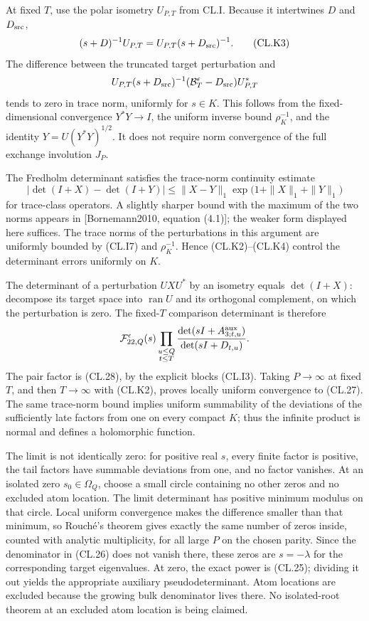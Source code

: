 At fixed \(T\), use the polar isometry \(U_{P,T}\) from CL.I. Because it intertwines \(D\) and \(D_{\rm src}\), \[
(s+D)^{-1}U_{P,T}
=U_{P,T}(s+D_{\rm src})^{-1}.
\tag{CL.K3}
\] The difference between the truncated target perturbation and \[
U_{P,T}(s+D_{\rm src})^{-1}
(\mathcal B_T^\epsilon-D_{\rm src})U_{P,T}^*
\] tends to zero in trace norm, uniformly for \(s\in K\). This follows from the fixed-dimensional convergence \(Y^*Y\to I\), the uniform inverse bound \(\rho_K^{-1}\), and the identity \(Y=U(Y^*Y)^{1/2}\). It does not require norm convergence of the full exchange involution \(J_P\).

The Fredholm determinant satisfies the trace-norm continuity estimate \[
|\det(I+X)-\det(I+Y)|
\leq \|X-Y\|_1
\exp\!\bigl(1+\|X\|_1+\|Y\|_1\bigr)
\tag{CL.K4}
\] for trace-class operators. A slightly sharper bound with the maximum of the two norms appears in {[}Bornemann2010, equation (4.1){]}; the weaker form displayed here suffices. The trace norms of the perturbations in this argument are uniformly bounded by (CL.I7) and \(\rho_K^{-1}\). Hence (CL.K2)--(CL.K4) control the determinant errors uniformly on \(K\).

The determinant of a perturbation \(U XU^*\) by an isometry equals \(\det(I+X)\): decompose its target space into \(\operatorname{ran}U\) and its orthogonal complement, on which the perturbation is zero. The fixed-\(T\) comparison determinant is therefore \[
\mathcal F_{22,Q}^\epsilon(s)
\prod_{\substack{u\leq Q\\t\leq T}}
\frac{\det(sI+A_{3;t,u}^{\rm aux})}
{\det(sI+D_{t,u})}.
\] The pair factor is (CL.28), by the explicit blocks (CL.I3). Taking \(P\to\infty\) at fixed \(T\), and then \(T\to\infty\) with (CL.K2), proves locally uniform convergence to (CL.27). The same trace-norm bound implies uniform summability of the deviations of the sufficiently late factors from one on every compact \(K\); thus the infinite product is normal and defines a holomorphic function.

The limit is not identically zero: for positive real \(s\), every finite factor is positive, the tail factors have summable deviations from one, and no factor vanishes. At an isolated zero \(s_0\in\Omega_Q\), choose a small circle containing no other zeros and no excluded atom location. The limit determinant has positive minimum modulus on that circle. Local uniform convergence makes the difference smaller than that minimum, so Rouché's theorem gives exactly the same number of zeros inside, counted with analytic multiplicity, for all large \(P\) on the chosen parity. Since the denominator in (CL.26) does not vanish there, these zeros are \(s=-\lambda\) for the corresponding target eigenvalues. At zero, the exact power is (CL.25); dividing it out yields the appropriate auxiliary pseudodeterminant. Atom locations are excluded because the growing bulk denominator lives there. No isolated-root theorem at an excluded atom location is being claimed.

